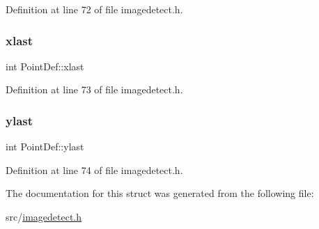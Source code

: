 Definition at line 72 of file imagedetect.\+h.

\mbox{\label{struct_point_def_a67add660c1003a776016ea794a4a6e77}} 
\subsubsection{\texorpdfstring{xlast}{xlast}}
{\footnotesize\ttfamily int Point\+Def\+::xlast}



Definition at line 73 of file imagedetect.\+h.

\mbox{\label{struct_point_def_afaedb9e75bd0d7252b0bd95abc4b77d4}} 
\subsubsection{\texorpdfstring{ylast}{ylast}}
{\footnotesize\ttfamily int Point\+Def\+::ylast}



Definition at line 74 of file imagedetect.\+h.



The documentation for this struct was generated from the following file\+:\begin{DoxyCompactItemize}
\item 
src/\mbox{\hyperlink{imagedetect_8h}{imagedetect.\+h}}\end{DoxyCompactItemize}
